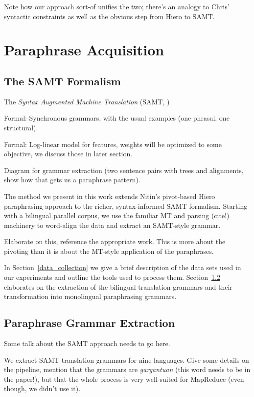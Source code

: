 \documentclass[11pt]{article}
\begin{document}
Note how our approach sort-of unifies the two; there's an analogy to
Chris' syntactic constraints as well as the obvious step from Hiero to
SAMT.

\section{Paraphrase Acquisition} \label{acquisition}



\subsection{The SAMT Formalism}

The \emph{Syntax Augmented Machine Translation} (SAMT,
\cite{Zollmann2006})

Formal: Synchronous grammars, with the usual examples (one phrasal, one
structural).

Formal: Log-linear model for features, weights will be optimized to some
objective, we discuss those in later section.

Diagram for grammar extraction (two sentence pairs with trees and
alignments, show how that gets us a paraphrase pattern). 



The method we present in this work extends Nitin's pivot-based Hiero
paraphrasing approach to the richer, syntax-informed SAMT
formalism. Starting with a bilingual parallel corpus, we use the
familiar MT and parsing (cite!) machinery to word-align the data and
extract an SAMT-style grammar.

Elaborate on this, reference the appropriate work. This is more about
the pivoting than it is about the MT-style application of the
paraphrases.

In Section~\ref{data_collection} we give a brief description of the
data sets used in our experiments and outline the tools used to
process them. Section~\ref{extraction} elaborates on the extraction
of the bilingual translation grammars and their transformation into
monolingual paraphrasing grammars.

\subsection{Paraphrase Grammar Extraction} \label{extraction}

Some talk about the SAMT approach needs to go here. 

We extract SAMT translation grammars for nine languages. Give some
details on the pipeline, mention that the grammars are
\emph{gargantuan} (this word needs to be in the paper!), but that the
whole process is very well-suited for MapReduce (even though, we
didn't use it).
\end{document}
